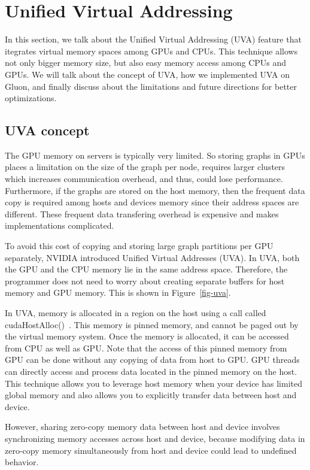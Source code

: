 \section{Unified Virtual Addressing}
\label{sec-uva}

In this section, we talk about the Unified Virtual Addressing (UVA) feature that itegrates virtual memory spaces among GPUs and CPUs.
This technique allows not only bigger memory size, but also easy memory access among CPUs and GPUs.
We will talk about the concept of UVA, how we implemented UVA on Gluon, and finally discuss about the limitations and future
directions for better optimizations.

\subsection{UVA concept}

The GPU memory on servers is typically very limited.
So storing graphs in GPUs places a limitation on the size of the graph per node, requires larger clusters which increases communication overhead, 
and thus, could lose performance.
Furthermore, if the graphs are stored on the host memory, 
then the frequent data copy is required among hosts and devices memory since their address spaces are different.
These frequent data transfering overhead is expensive and makes implementations complicated. 


To avoid this cost of copying and storing large graph partitions per GPU separately,
NVIDIA introduced Unified Virtual Addresses (UVA). In UVA, both the GPU and the CPU memory lie in the same address space.
Therefore, the programmer does not need to worry about creating separate buffers for host memory and GPU memory. This is shown in Figure~\ref{fig-uva}. 

In UVA, memory is allocated in a region on the host using a call called cudaHostAlloc()~\cite{alloc-cuda}. This memory is pinned memory, and cannot be paged out by the virtual memory system. Once the memory is allocated, it can be accessed from CPU as well as GPU. Note that the access of this pinned memory from GPU can be done without any copying of data from host to GPU. GPU threads can directly access and process data located in the pinned memory on the host. This technique allows you to leverage host memory when your device has limited global memory and also allows you to explicitly transfer data between host and device. 

However, sharing zero-copy memory data between host and device involves synchronizing memory accesses across host and device, because modifying data in zero-copy memory simultaneously from host and device could lead to undefined behavior. 

